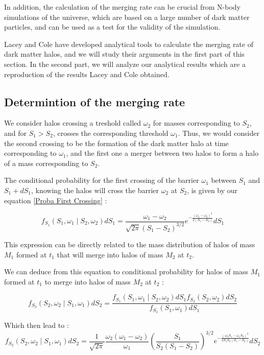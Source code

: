 In addition, the calculation of the merging rate can be crucial from N-body simulations of the universe, which are based on a large number of dark matter particles, and can be used as a test for the validity of the simulation.

Lacey and Cole have developed analytical tools to calculate the merging rate of dark matter halos\cite{LaC}, and we will study their arguments in the first part of this section. In the second part, we will analyze our analytical results which are a reproduction of the results Lacey and Cole obtained.

\subsection{Determintion of the merging rate}

We consider halos crossing a treshold called $\omega_2$ for masses corresponding to $S_2$, and for $S_1 > S_2$, crosses the corresponding threshold $\omega_1$. Thus, we would consider the second crossing to be the formation of the dark matter halo at time corresponding to $\omega_1$, and the first one a merger between two halos to form a halo of a mass corresponding to $S_2$.

The conditional probability for the first crossing of the barrier $\omega_1$ between $S_1$ and $S_1 + dS_1$, knowing the halos will cross the barrier $\omega_2$ at $S_2$, is given by our equation \ref{Proba First Crossing} :

\begin{equation}
\label{Cond Proba 1}
f_{S_1}(S_1, \omega_1 \mid S_2, \omega_2) dS_1 =  \frac{\omega_1 - \omega_2}{\sqrt{2\pi}(S_1 - S_2)^{3/2}} e^{-\frac{(\omega_1 - \omega_2)^2}{2(S_1 - S_2)} } dS_1
\end{equation}

This expression can be directly related to the mass distribution of halos of mass $M_1$ formed at $t_1$ that will merge into halos of mass $M_2$ at $t_2$.

We can deduce from this equation to conditional probability for halos of mass $M_1$ formed at $t_1$ to merge into halos of mass $M_2$ at $t_2$ :

\begin{equation}
\label{Cond Proba 2}
f_{S_2}(S_2, \omega_2 \mid S_1, \omega_1) dS_2 = \frac{f_{S_1}(S_1, \omega_1 \mid S_2, \omega_2) dS_1 f_{S_2}(S_2, \omega_2) dS_2}{f_{S_1}(S_1, \omega_1) dS_1}
\end{equation}

Which then lead to :
\begin{equation}
\label{Cond Proba 3}
f_{S_2}(S_2, \omega_2 \mid S_1, \omega_1) dS_2 = \frac{1}{\sqrt{2\pi}} \frac{\omega_2(\omega_1 - \omega_2)}{\omega_1} \left(\frac{S_1}{S_2(S_1 - S_2)}\right)^{3/2} e^{-\frac{(\omega_2 S_1 - \omega_1 S_2)^2}{2S_1 S_2 (S_1 - S_2)} } dS_2
\end{equation}

